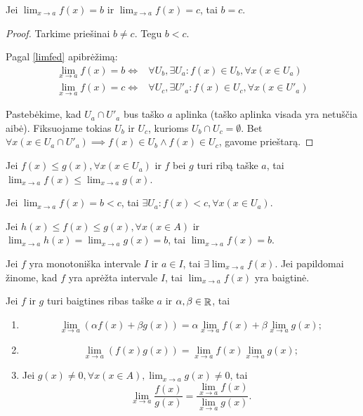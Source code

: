 \begin{prop}
  Jei $\lim _{x \to a} f(x) = b$ ir $\lim _{x \to a} f(x) = c$, tai $b = c$.
  \begin{proof}
    Tarkime priešinai $b \neq c$. Tegu $b < c$.

    Pagal \ref{limfed} apibrėžimą:
    \begin{align*}
      \lim _{x \to a} f(x) = b \iff&%
        \forall U_{b}, \exists U_{a} :%
        f(x) \in U_{b}, \forall x(x \in U_{a}) \\
      \lim _{x \to a} f(x) = c \iff&%
        \forall U_{c}, \exists U'_{a} :%
        f(x) \in U_{c}, \forall x(x \in U'_{a})
    \end{align*}

    Pastebėkime, kad $U_{a} \cap U'_{a}$ bus taško $a$ aplinka (taško 
    aplinka visada yra netuščia aibė).
    Fiksuojame tokias $U_{b}$ ir $U_{c}$, kurioms 
    $U_{b} \cap U_{c} = \emptyset$. Bet 
    $\forall x (x \in U_{a} \cap U'_{a}) \implies%
      f(x) \in U_{b} \land f(x) \in U_{c}$, gavome prieštarą.
  \end{proof}
\end{prop}

\begin{prop}
  Jei $f(x) \leq g(x), \forall x (x \in U_{a})$ ir $f$ bei $g$ turi ribą
  taške $a$, tai $\lim _{x \to a} f(x) \leq \lim _{x \to a} g(x)$.
\end{prop}

\begin{prop}
  Jei $\lim _{x \to a} f(x) = b < c$, tai 
  $\exists U_{a} : f(x) < c, \forall x (x \in U_{a})$.
\end{prop}

\begin{prop}
  Jei $h(x) \leq f(x) \leq g(x), \forall x(x \in A)$ ir 
  $\lim _{x \to a} h(x) = \lim _{x \to a} g(x) = b$, tai
  $\lim _{x \to a} f(x) = b$.
\end{prop}

\begin{prop}
  Jei $f$ yra monotoniška intervale $I$ ir $a \in I$, tai 
  $\exists \lim _{x \to a} f(x)$. Jei papildomai žinome, kad $f$ yra
  aprėžta intervale $I$, tai $\lim _{x \to a} f(x)$ yra baigtinė.
\end{prop}

\begin{prop}
  Jei $f$ ir $g$ turi baigtines ribas taške $a$ ir 
  $\alpha, \beta \in \mathop{\mathbb{R}}$, tai 
  \begin{enumerate}
    \item \[
      \lim _{x \to a} (\alpha f(x) + \beta g(x)) =%
        \alpha \lim _{x \to a} f(x) + \beta \lim _{x \to a} g(x);
      \]
    \item \[
      \lim _{x \to a} (f(x)g(x)) =%
        \lim _{x \to a} f(x) \lim _{x \to a} g(x);
      \]
    \item Jei 
      $g(x) \neq 0, \forall x (x \in A), \lim _{x \to a} g(x) \neq 0$, tai
      \[
      \lim _{x \to a} \frac{f(x)}{g(x)} =%
        \frac{\lim _{x \to a} f(x)}{\lim _{x \to a} g(x)}.
      \]
  \end{enumerate}
\end{prop}

